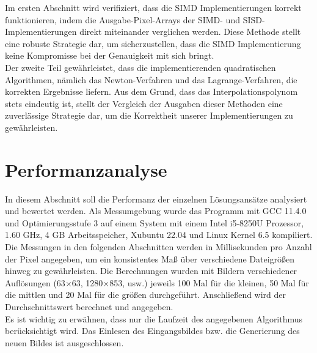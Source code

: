\documentclass[course=erap]{aspdoc}
\begin{document}
Im ersten Abschnitt wird verifiziert, dass die SIMD Implementierungen korrekt funktionieren, indem die Ausgabe-Pixel-Arrays der SIMD- und SISD- Implementierungen direkt miteinander verglichen werden. Diese Methode stellt eine robuste Strategie dar, um sicherzustellen, dass die SIMD Implementierung keine Kompromisse bei der Genauigkeit mit sich bringt. \\
Der zweite Teil gewährleistet, dass die implementierenden quadratischen Algorithmen, nämlich das Newton-Verfahren und das Lagrange-Verfahren, die korrekten Ergebnisse liefern. Aus dem Grund, dass das Interpolationspolynom stets eindeutig ist, stellt der Vergleich der Ausgaben dieser Methoden eine zuverlässige Strategie dar, um die Korrektheit unserer Implementierungen zu gewährleisten.


\section{Performanzanalyse}
In diesem Abschnitt soll die Performanz der einzelnen Lösungsansätze analysiert und bewertet werden. Als Messumgebung wurde das Programm mit GCC 11.4.0 und Optimierungsstufe 3 auf einem System mit einem Intel i5-8250U Prozessor, 1.60 GHz, 4 GB Arbeitsspeicher, Xubuntu 22.04 und Linux Kernel 6.5 kompiliert. \\
Die Messungen in den folgenden Abschnitten werden in Millisekunden pro Anzahl der Pixel angegeben, um ein konsistentes Maß über verschiedene Dateigrößen hinweg zu gewährleisten. Die Berechnungen wurden mit Bildern verschiedener Auflösungen (63$\times$63,  1280$\times$853, usw.) jeweils 100 Mal für die kleinen, 50 Mal für die mittlen und 20 Mal für die größen durchgeführt. Anschließend wird der Durchschnittswert berechnet und angegeben. \\ 
Es ist wichtig zu erwähnen, dass nur die Laufzeit des angegebenen Algorithmus berücksichtigt wird. Das Einlesen des Eingangsbildes bzw. die Generierung des neuen Bildes ist ausgeschlossen.
\end{document}
